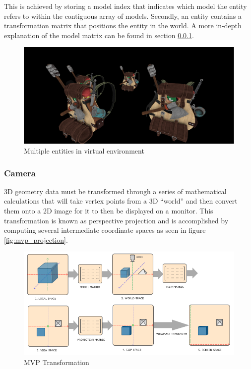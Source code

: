 \documentclass[11pt]{article}
\begin{document}
This is achieved by storing a model index that indicates which model the entity
refers to within the contiguous array of models. Secondly, an entity contains a
transformation matrix that positions the entity in the world. A more in-depth
explanation of the model matrix can be found in section \ref{camera}.

\begin{figure}[H]
  \centering
  \includegraphics[width=\textwidth]{images/entities.png}
  \caption{Multiple entities in virtual environment}
  \label{fig:entities}
\end{figure}

\subsubsection{Camera} \label{camera}
3D geometry data must be transformed through a series of mathematical
calculations that will take vertex points from a 3D ``world'' and then convert
them onto a 2D image for it to then be displayed on a monitor. This
transformation is known as perspective projection \cite{3d_projection} and is
accomplished by computing several intermediate coordinate spaces as seen in
figure \ref{fig:mvp_projection}.

\begin{figure}[H]
  \centering
  \includegraphics[width=\textwidth]{images/mvp.png}
  \caption{MVP Transformation \cite{coordinate_systems}}
  \label{fig:mvp_transformation} 
\end{figure}
\end{document}

